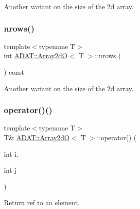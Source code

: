 Another variant on the size of the 2d array. 

\mbox{\label{classADAT_1_1Array2dO_a8c2e98f898dd0406c9ac9c9e04b1eb0d}} 
\subsubsection{\texorpdfstring{nrows()}{nrows()}\hspace{0.1cm}{\footnotesize\ttfamily [2/2]}}
{\footnotesize\ttfamily template$<$typename T$>$ \\
int \mbox{\hyperlink{classADAT_1_1Array2dO}{A\+D\+A\+T\+::\+Array2dO}}$<$ T $>$\+::nrows (\begin{DoxyParamCaption}{ }\end{DoxyParamCaption}) const\hspace{0.3cm}{\ttfamily [inline]}}



Another variant on the size of the 2d array. 

\mbox{\label{classADAT_1_1Array2dO_ace450ca2a5484194b075e240750cfeae}} 
\subsubsection{\texorpdfstring{operator()()}{operator()()}\hspace{0.1cm}{\footnotesize\ttfamily [1/4]}}
{\footnotesize\ttfamily template$<$typename T$>$ \\
T\& \mbox{\hyperlink{classADAT_1_1Array2dO}{A\+D\+A\+T\+::\+Array2dO}}$<$ T $>$\+::operator() (\begin{DoxyParamCaption}\item[{int}]{i,  }\item[{int}]{j }\end{DoxyParamCaption})\hspace{0.3cm}{\ttfamily [inline]}}



Return ref to an element. 

\mbox{\label{classADAT_1_1Array2dO_ace450ca2a5484194b075e240750cfeae}} 
